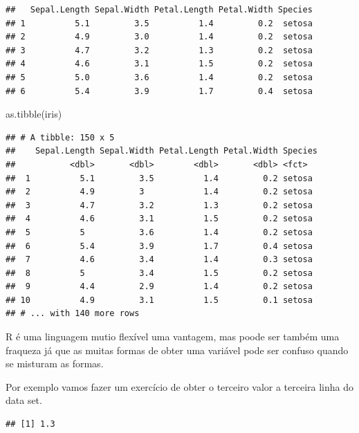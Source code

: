 \documentclass[
]{article}
\newenvironment{Shaded}{\begin{snugshade}}{\end{snugshade}}
\newcommand{\DecValTok}[1]{\textcolor[rgb]{0.00,0.00,0.81}{#1}}
\newcommand{\FunctionTok}[1]{\textcolor[rgb]{0.00,0.00,0.00}{#1}}
\newcommand{\NormalTok}[1]{#1}
\newcommand{\SpecialCharTok}[1]{\textcolor[rgb]{0.00,0.00,0.00}{#1}}
\begin{document}
\begin{verbatim}
##   Sepal.Length Sepal.Width Petal.Length Petal.Width Species
## 1          5.1         3.5          1.4         0.2  setosa
## 2          4.9         3.0          1.4         0.2  setosa
## 3          4.7         3.2          1.3         0.2  setosa
## 4          4.6         3.1          1.5         0.2  setosa
## 5          5.0         3.6          1.4         0.2  setosa
## 6          5.4         3.9          1.7         0.4  setosa
\end{verbatim}

\begin{Shaded}
\begin{Highlighting}[]
\FunctionTok{as.tibble}\NormalTok{(iris)}
\end{Highlighting}
\end{Shaded}

\begin{verbatim}
## # A tibble: 150 x 5
##    Sepal.Length Sepal.Width Petal.Length Petal.Width Species
##           <dbl>       <dbl>        <dbl>       <dbl> <fct>  
##  1          5.1         3.5          1.4         0.2 setosa 
##  2          4.9         3            1.4         0.2 setosa 
##  3          4.7         3.2          1.3         0.2 setosa 
##  4          4.6         3.1          1.5         0.2 setosa 
##  5          5           3.6          1.4         0.2 setosa 
##  6          5.4         3.9          1.7         0.4 setosa 
##  7          4.6         3.4          1.4         0.3 setosa 
##  8          5           3.4          1.5         0.2 setosa 
##  9          4.4         2.9          1.4         0.2 setosa 
## 10          4.9         3.1          1.5         0.1 setosa 
## # ... with 140 more rows
\end{verbatim}

R é uma linguagem mutio flexível uma vantagem, mas poode ser também uma
fraqueza já que as muitas formas de obter uma variável pode ser confuso
quando se misturam as formas.

Por exemplo vamos fazer um exercício de obter o terceiro valor a
terceira linha do data set.

\begin{Shaded}
\end{Shaded}

\begin{verbatim}
## [1] 1.3
\end{verbatim}
\end{document}
